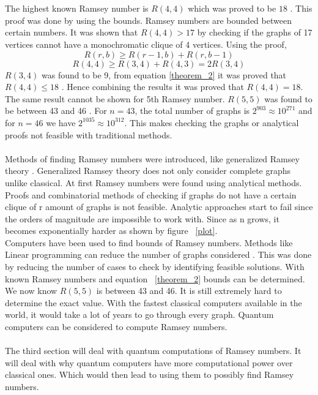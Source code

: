 \documentclass{Assignment}
\begin{document}
\\\\
The highest known Ramsey number is $R(4,4)$ which was proved to be $18$ \cite{GreenwoodGleason1955}.
This proof was done by using the bounds.
Ramsey numbers are bounded between certain numbers.
It was shown that $R(4,4) > 17$ by checking if the graphs of 17 vertices cannot have a monochromatic clique of 4 vertices. 
Using the proof,
\begin{equation}
	R(r ,b) \geq R(r-1,b)+ R(r,b-1) 
	\label{theorem_2}
\end{equation}
$$R(4,4) \geq R(3,4)+R(4,3) = 2R(3,4)$$
$R(3,4) $ was found to be 9, from equation \eqref{theorem_2} it was proved that $R(4,4) \leq 18$ \cite{GreenwoodGleason1955}.
Hence combining the results it was proved that $R(4,4) = 18$.
The same result cannot be shown for 5th Ramsey number.
$R(5,5)$ was found to be between 43 \cite{Exoo1993} and 46 \cite{angeltveit2024r55le46}.
For $n= 43$, the total number of graphs is $2^{903} \approx 10^{271}$ and for $n=46$ we have $2^{1035}\approx10^{312}$.
This makes checking the graphs or analytical proofs not feasible with traditional methods.
\\\\
Methods of finding Ramsey numbers were introduced, like generalized Ramsey theory \cite{burr1981generalized}. 
Generalized Ramsey theory does not only consider complete graphs unlike classical.
At first Ramsey numbers were found using analytical methods.
Proofs and combinatorial methods of checking if graphs do not have a certain clique of r amount of graphs is not feasible.
Analytic approaches start to fail since the orders of magnitude are impossible to work with.
Since as n grows, it becomes exponentially harder as shown by figure ~\ref{plot}.
\\
Computers have been used to find bounds of Ramsey numbers.
Methods like Linear programming can reduce the number of graphs considered \cite{angeltveit2024r55le46}.
This was done by reducing the number of cases to check by identifying feasible solutions. 
With known Ramsey numbers and equation ~\ref{theorem_2} bounds can be determined.
We now know $R(5,5)$ is between 43 and 46.
It is still extremely hard to determine the exact value.
With the fastest classical computers available in the world, it would take a lot of years to go through every graph.
Quantum computers can be considered to compute Ramsey numbers.
\\\\
The third section will deal with quantum computations of Ramsey numbers.
It will deal with why quantum computers have more computational power over classical ones.
Which would then lead to using them to possibly find Ramsey numbers.
\end{document}
